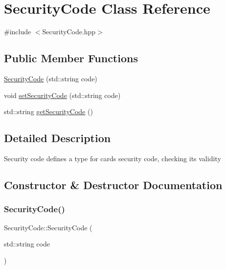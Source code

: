 \hypertarget{class_security_code}{}\section{Security\+Code Class Reference}
\label{class_security_code}


{\ttfamily \#include $<$Security\+Code.\+hpp$>$}

\subsection*{Public Member Functions}
\begin{DoxyCompactItemize}
\item 
\mbox{\hyperlink{class_security_code_acd92cad70c65fca9cad5d62e79474180}{Security\+Code}} (std\+::string code)
\item 
void \mbox{\hyperlink{class_security_code_a027077edcff7484b53def6ba4d94af01}{set\+Security\+Code}} (std\+::string code)
\item 
std\+::string \mbox{\hyperlink{class_security_code_aacb04fcdfb3960ebdaa33b7ba518fc83}{get\+Security\+Code}} ()
\end{DoxyCompactItemize}


\subsection{Detailed Description}
Security code defines a type for card\textquotesingle{}s security code, checking its validity 

\subsection{Constructor \& Destructor Documentation}
\mbox{\label{class_security_code_acd92cad70c65fca9cad5d62e79474180}} 
\subsubsection{\texorpdfstring{SecurityCode()}{SecurityCode()}}
{\footnotesize\ttfamily Security\+Code\+::\+Security\+Code (\begin{DoxyParamCaption}\item[{std\+::string}]{code }\end{DoxyParamCaption})}



